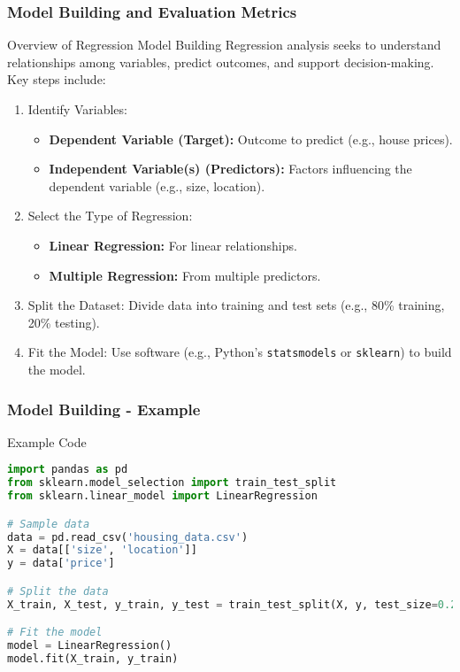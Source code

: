 \documentclass{beamer}
\begin{document}
\begin{frame}
    \frametitle{Model Building and Evaluation Metrics}
    \begin{block}{Overview of Regression Model Building}
        Regression analysis seeks to understand relationships among variables, predict outcomes, and support decision-making. Key steps include:
    \end{block}
    \begin{enumerate}
        \item Identify Variables:
            \begin{itemize}
                \item \textbf{Dependent Variable (Target):} Outcome to predict (e.g., house prices).
                \item \textbf{Independent Variable(s) (Predictors):} Factors influencing the dependent variable (e.g., size, location).
            \end{itemize}
        \item Select the Type of Regression:
            \begin{itemize}
                \item \textbf{Linear Regression:} For linear relationships.
                \item \textbf{Multiple Regression:} From multiple predictors.
            \end{itemize}
        \item Split the Dataset: 
            Divide data into training and test sets (e.g., 80\% training, 20\% testing).
        \item Fit the Model: 
            Use software (e.g., Python's \texttt{statsmodels} or \texttt{sklearn}) to build the model.
    \end{enumerate}
\end{frame}

\begin{frame}[fragile]
    \frametitle{Model Building - Example}
    \begin{block}{Example Code}
        \begin{lstlisting}[language=Python]
import pandas as pd
from sklearn.model_selection import train_test_split
from sklearn.linear_model import LinearRegression

# Sample data
data = pd.read_csv('housing_data.csv')
X = data[['size', 'location']]
y = data['price']

# Split the data
X_train, X_test, y_train, y_test = train_test_split(X, y, test_size=0.2, random_state=42)

# Fit the model
model = LinearRegression()
model.fit(X_train, y_train)
        \end{lstlisting}
    \end{block}
\end{frame}
\end{document}
